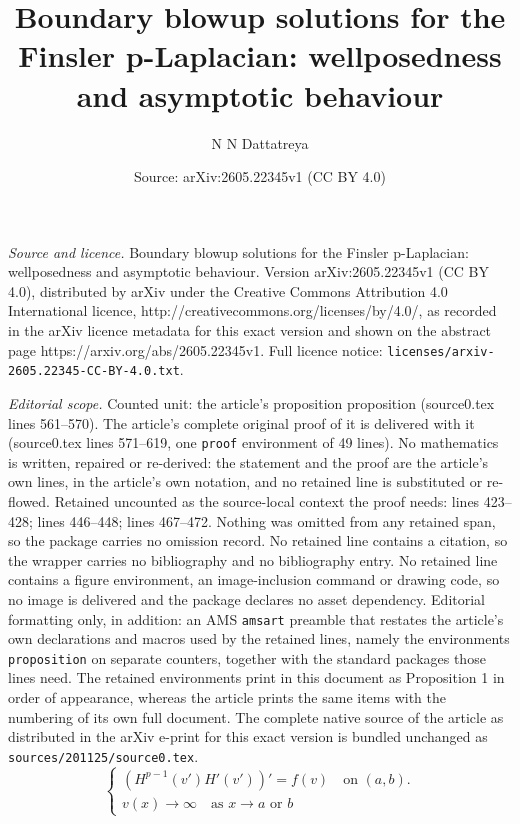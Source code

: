 \documentclass[10pt,a4paper]{amsart}
\title{Boundary blowup solutions for the Finsler p-Laplacian: wellposedness and asymptotic behaviour}
\author{N N Dattatreya}
\date{Source: arXiv:2605.22345v1 (CC BY 4.0)}
\begin{document}
\maketitle

\noindent\emph{Source and licence.} Boundary blowup solutions for the Finsler p-Laplacian: wellposedness and asymptotic behaviour. Version arXiv:2605.22345v1 (CC BY 4.0), distributed by arXiv under the Creative Commons Attribution 4.0 International licence, http://creativecommons.org/licenses/by/4.0/, as recorded in the arXiv licence metadata for this exact version and shown on the abstract page https://arxiv.org/abs/2605.22345v1. Full licence notice: \texttt{licenses/arxiv-2605.22345-CC-BY-4.0.txt}.\par\smallskip

\noindent\textit{Editorial scope.} Counted unit: the article's proposition proposition (source0.tex lines 561--570). The article's complete original proof of it is delivered with it (source0.tex lines 571--619, one \texttt{proof} environment of 49 lines). No mathematics is written, repaired or re-derived: the statement and the proof are the article's own lines, in the article's own notation, and no retained line is substituted or re-flowed.  Retained uncounted as the source-local context the proof needs: lines 423--428; lines 446--448; lines 467--472.  Nothing was omitted from any retained span, so the package carries no omission record.  No retained line contains a citation, so the wrapper carries no bibliography and no bibliography entry.  No retained line contains a figure environment, an image-inclusion command or drawing code, so no image is delivered and the package declares no asset dependency.  Editorial formatting only, in addition: an AMS \texttt{amsart} preamble that restates the article's own declarations and macros used by the retained lines, namely the environments \texttt{proposition} on separate counters, together with the standard packages those lines need.  The retained environments print in this document as Proposition 1 in order of appearance, whereas the article prints the same items with the numbering of its own full document.  The complete native source of the article as distributed in the arXiv e-print for this exact version is bundled unchanged as \texttt{sources/201125/source0.tex}.
        \begin{equation}\label{eqn in one dim}
        \begin{cases}
      \left(H^{p-1}(v')H'(v')\right)'=f(v)\quad \text{on } (a,b). \\
      v(x)\to \infty \quad \text{as } x\to a \text{ or }b
        \end{cases}
        \end{equation}
\end{document}
